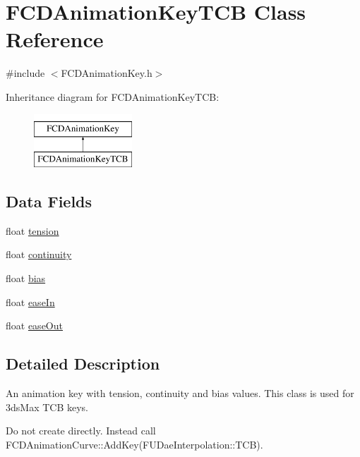 \hypertarget{classFCDAnimationKeyTCB}{
\section{FCDAnimationKeyTCB Class Reference}
\label{classFCDAnimationKeyTCB}
}


{\ttfamily \#include $<$FCDAnimationKey.h$>$}

Inheritance diagram for FCDAnimationKeyTCB:\begin{figure}[H]
\begin{center}
\leavevmode
\includegraphics[height=2.000000cm]{classFCDAnimationKeyTCB}
\end{center}
\end{figure}
\subsection*{Data Fields}
\begin{DoxyCompactItemize}
\item 
float \hyperlink{classFCDAnimationKeyTCB_ab1f6045357667b2adff959bb737925f1}{tension}
\item 
float \hyperlink{classFCDAnimationKeyTCB_ac82f078ec71eed7e6ed88dad95e2ad45}{continuity}
\item 
float \hyperlink{classFCDAnimationKeyTCB_a1676e8d6fded46456f042f9fb20e7c1d}{bias}
\item 
float \hyperlink{classFCDAnimationKeyTCB_a256d60dd1899471eae3a633734e7edaa}{easeIn}
\item 
float \hyperlink{classFCDAnimationKeyTCB_a45cdf0eff558ae6b5721a65d072e452f}{easeOut}
\end{DoxyCompactItemize}


\subsection{Detailed Description}
An animation key with tension, continuity and bias values. This class is used for 3dsMax TCB keys.

Do not create directly. Instead call FCDAnimationCurve::AddKey(FUDaeInterpolation::TCB). 

